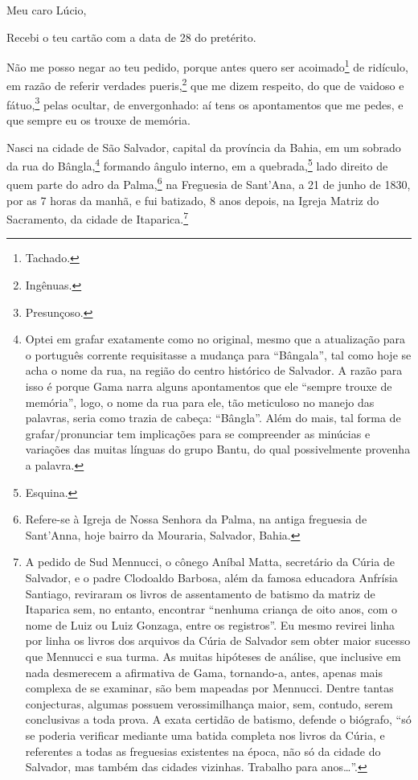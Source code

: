 Meu caro Lúcio,

Recebi o teu cartão com a data de 28 do pretérito.

Não me posso negar ao teu pedido, porque antes quero ser
acoimado\footnote{Tachado.} de ridículo, em razão de referir verdades
pueris,\footnote{Ingênuas.} que me dizem respeito, do que de vaidoso e
fátuo,\footnote{Presunçoso.} pelas ocultar, de envergonhado: aí tens
os apontamentos que me pedes, e que sempre eu os trouxe de memória.

Nasci na cidade de São Salvador, capital da província da Bahia, em um
sobrado da rua do Bângla,\footnote{Optei em grafar exatamente como no
  original, mesmo que a atualização para o português corrente
  requisitasse a mudança para ``Bângala'', tal como hoje se acha o nome da
  rua, na região do centro histórico de Salvador. A razão para isso é
  porque Gama narra alguns apontamentos que ele ``sempre trouxe de
  memória'', logo, o nome da rua para ele, tão meticuloso no manejo das
  palavras, seria como trazia de cabeça: ``Bângla''. Além do mais, tal
  forma de grafar/pronunciar tem implicações para se compreender as
  minúcias e variações das muitas línguas do grupo Bantu, do qual
  possivelmente provenha a palavra.} formando ângulo interno, em a
quebrada,\footnote{Esquina.} lado direito de quem parte do adro da 
Palma,\footnote{Refere-se à Igreja de Nossa Senhora da Palma, na antiga
  freguesia de Sant'Anna, hoje bairro da Mouraria, Salvador, Bahia.} na
Freguesia de Sant'Ana, a 21 de junho de 1830, por as 7 horas da manhã, e
fui batizado, 8 anos depois, na Igreja Matriz do Sacramento, da cidade
de Itaparica.\footnote{A pedido de Sud Mennucci, o cônego Aníbal Matta, \label{mennucci}
  secretário da Cúria de Salvador, e o padre Clodoaldo Barbosa, além da 
  famosa educadora Anfrísia Santiago, reviraram os livros de
  assentamento de batismo da matriz de Itaparica sem, no entanto,
  encontrar ``nenhuma criança de oito anos, com o nome de Luiz ou Luiz
  Gonzaga, entre os registros''. Eu mesmo revirei linha por linha os
  livros dos arquivos da Cúria de Salvador sem obter maior sucesso que
  Mennucci e sua turma. As muitas hipóteses de análise, que inclusive em
  nada desmerecem a afirmativa de Gama, tornando-a, antes, apenas mais
  complexa de se examinar, são bem mapeadas por Mennucci. Dentre tantas
  conjecturas, algumas possuem verossimilhança maior, sem, contudo,
  serem conclusivas a toda prova. A exata certidão de batismo, defende o
  biógrafo, ``só se poderia verificar mediante uma batida completa nos
  livros da Cúria, e referentes a todas as freguesias existentes na
  época, não só da cidade do Salvador, mas também das cidades vizinhas.
  Trabalho para anos\ldots{}''.}

